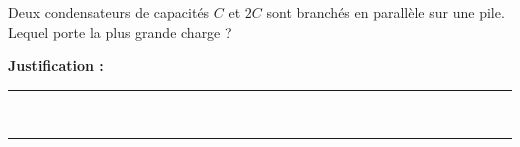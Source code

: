 Deux condensateurs de capacités $C$ et $2C$ sont branchés en parallèle sur une pile. Lequel porte la plus grande charge ?

\choices

\noindent\textbf{Justification :} \hrulefill \\[2.5ex]
\rule{\linewidth}{0.4pt} \\[2.5ex]
\rule{\linewidth}{0.4pt}
\vfill

